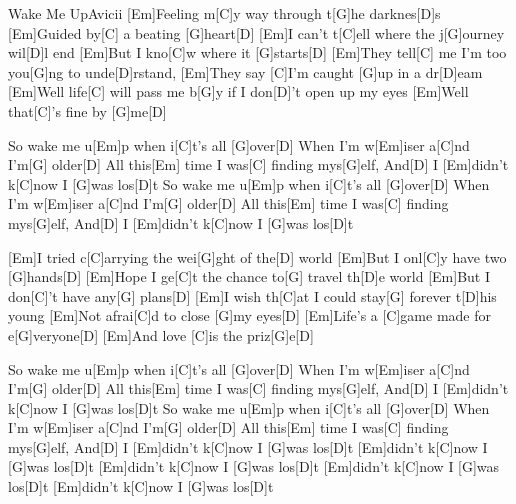 \documentclass[../main.tex]{subfiles}
\begin{document}
\begin{song}[7]{Wake Me Up}{Avicii}{}
[Em]Feeling m[C]y way through t[G]he darknes[D]s
[Em]Guided by[C] a beating [G]heart[D]{\hh}
[Em]I can't t[C]ell where the j[G]ourney wil[D]l end
[Em]But I kno[C]w where it [G]starts[D]{\hh}
[Em]They tell[C] me I'm too you[G]ng to unde[D]rstand,
[Em]They say [C]I'm caught [G]up in a dr[D]eam
[Em]Well life[C] will pass me b[G]y if I don[D]'t open up my eyes
[Em]Well that[C]'s fine by [G]me[D]{\hh}

So wake me u[Em]p when i[C]t's all [G]over[D]{\hh}
When I'm w[Em]iser a[C]nd I'm[G] older[D]{\hh}
All this[Em] time I was[C] finding mys[G]elf, And[D] I
[Em]didn't k[C]now I [G]was los[D]t
So wake me u[Em]p when i[C]t's all [G]over[D]{\hh}
When I'm w[Em]iser a[C]nd I'm[G] older[D]{\hh}
All this[Em] time I was[C] finding mys[G]elf, And[D] I
[Em]didn't k[C]now I [G]was los[D]t

[Em]I tried c[C]arrying the wei[G]ght of the[D] world
[Em]But I onl[C]y have two [G]hands[D]{\hh}
[Em]Hope I ge[C]t the chance to[G] travel th[D]e world
[Em]But I don[C]'t have any[G] plans[D]{\hh}
[Em]I wish th[C]at I could stay[G] forever t[D]his young
[Em]Not afrai[C]d to close [G]my eyes[D]{\hh}
[Em]Life's a [C]game made for e[G]veryone[D]{\hh}
[Em]And love [C]is the priz[G]e[D]{\hh}

So wake me u[Em]p when i[C]t's all [G]over[D]{\hh}
When I'm w[Em]iser a[C]nd I'm[G] older[D]{\hh}
All this[Em] time I was[C] finding mys[G]elf, And[D] I
[Em]didn't k[C]now I [G]was los[D]t
So wake me u[Em]p when i[C]t's all [G]over[D]{\hh}
When I'm w[Em]iser a[C]nd I'm[G] older[D]{\hh}
All this[Em] time I was[C] finding mys[G]elf, And[D] I
[Em]didn't k[C]now I [G]was los[D]t
[Em]didn't k[C]now I [G]was los[D]t
[Em]didn't k[C]now I [G]was los[D]t
[Em]didn't k[C]now I [G]was los[D]t
[Em]didn't k[C]now I [G]was los[D]t
\end{song}
\end{document}
